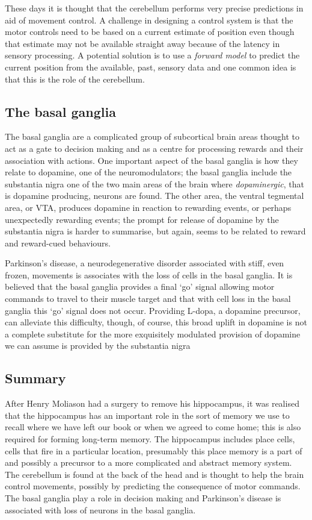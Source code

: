 \documentclass[12pt]{article}
\begin{document}
These days it is thought that the cerebellum performs very precise
predictions in aid of movement control. A challenge in designing a control system is that the
motor controls need to be based on a current estimate of position even
though that estimate may not be available straight away because of the
latency in sensory processing. A potential solution is to use a
\textsl{forward model} to predict the current position from the
available, past, sensory data and one common idea is that this is the
role of the cerebellum.

\subsection*{The basal ganglia}

The basal ganglia are a complicated group of subcortical brain areas
thought to act as a gate to decision making and as a centre for
processing rewards and their association with actions. One important
aspect of the basal ganglia is how they relate to dopamine, one of the
neuromodulators; the basal ganglia include the substantia nigra one of
the two main areas of the brain where \textsl{dopaminergic}, that is
dopamine producing, neurons are found. The other area, the ventral
tegmental area, or VTA, produces dopamine in reaction to rewarding
events, or perhaps unexpectedly rewarding events; the prompt for
release of dopamine by the substantia nigra is harder to summarise,
but again, seems to be related to reward and reward-cued behaviours.

Parkinson's disease, a neurodegenerative disorder associated with
stiff, even frozen, movements is associates with the loss of cells in
the basal ganglia. It is believed that the basal ganglia provides a
final `go' signal allowing motor commands to travel to their muscle
target and that with cell loss in the basal ganglia this `go' signal
does not occur. Providing L-dopa, a dopamine precursor, can alleviate
this difficulty, though, of course, this broad uplift in dopamine is
not a complete substitute for the more exquisitely modulated provision
of dopamine we can assume is provided by the substantia nigra

\subsection*{Summary}

After Henry Moliason had a surgery to remove his hippocampus, it was
realised that the hippocampus has an important role in the sort of
memory we use to recall where we have left our book or when we agreed
to come home; this is also required for forming long-term memory. The
hippocampus includes place cells, cells that fire in a particular
location, presumably this place memory is a part of and possibly a
precursor to a more complicated and abstract memory system. The
cerebellum is found at the back of the head and is thought to help the
brain control movements, possibly by predicting the consequence of
motor commands. The basal ganglia play a role in decision making and
Parkinson's disease is associated with loss of neurons in the basal
ganglia.
\end{document}
